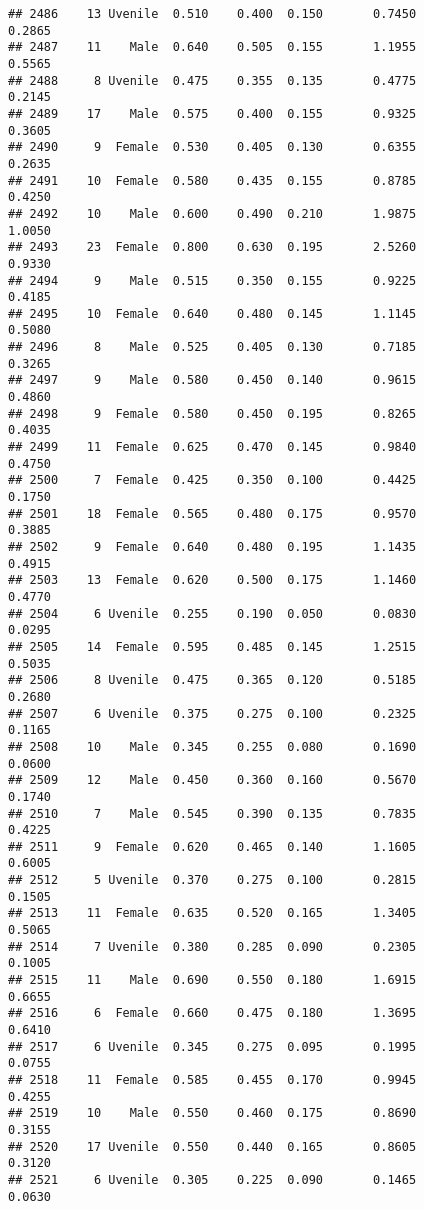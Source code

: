 \documentclass[
]{article}
\begin{document}
\begin{verbatim}
## 2486    13 Uvenile  0.510    0.400  0.150       0.7450         0.2865
## 2487    11    Male  0.640    0.505  0.155       1.1955         0.5565
## 2488     8 Uvenile  0.475    0.355  0.135       0.4775         0.2145
## 2489    17    Male  0.575    0.400  0.155       0.9325         0.3605
## 2490     9  Female  0.530    0.405  0.130       0.6355         0.2635
## 2491    10  Female  0.580    0.435  0.155       0.8785         0.4250
## 2492    10    Male  0.600    0.490  0.210       1.9875         1.0050
## 2493    23  Female  0.800    0.630  0.195       2.5260         0.9330
## 2494     9    Male  0.515    0.350  0.155       0.9225         0.4185
## 2495    10  Female  0.640    0.480  0.145       1.1145         0.5080
## 2496     8    Male  0.525    0.405  0.130       0.7185         0.3265
## 2497     9    Male  0.580    0.450  0.140       0.9615         0.4860
## 2498     9  Female  0.580    0.450  0.195       0.8265         0.4035
## 2499    11  Female  0.625    0.470  0.145       0.9840         0.4750
## 2500     7  Female  0.425    0.350  0.100       0.4425         0.1750
## 2501    18  Female  0.565    0.480  0.175       0.9570         0.3885
## 2502     9  Female  0.640    0.480  0.195       1.1435         0.4915
## 2503    13  Female  0.620    0.500  0.175       1.1460         0.4770
## 2504     6 Uvenile  0.255    0.190  0.050       0.0830         0.0295
## 2505    14  Female  0.595    0.485  0.145       1.2515         0.5035
## 2506     8 Uvenile  0.475    0.365  0.120       0.5185         0.2680
## 2507     6 Uvenile  0.375    0.275  0.100       0.2325         0.1165
## 2508    10    Male  0.345    0.255  0.080       0.1690         0.0600
## 2509    12    Male  0.450    0.360  0.160       0.5670         0.1740
## 2510     7    Male  0.545    0.390  0.135       0.7835         0.4225
## 2511     9  Female  0.620    0.465  0.140       1.1605         0.6005
## 2512     5 Uvenile  0.370    0.275  0.100       0.2815         0.1505
## 2513    11  Female  0.635    0.520  0.165       1.3405         0.5065
## 2514     7 Uvenile  0.380    0.285  0.090       0.2305         0.1005
## 2515    11    Male  0.690    0.550  0.180       1.6915         0.6655
## 2516     6  Female  0.660    0.475  0.180       1.3695         0.6410
## 2517     6 Uvenile  0.345    0.275  0.095       0.1995         0.0755
## 2518    11  Female  0.585    0.455  0.170       0.9945         0.4255
## 2519    10    Male  0.550    0.460  0.175       0.8690         0.3155
## 2520    17 Uvenile  0.550    0.440  0.165       0.8605         0.3120
## 2521     6 Uvenile  0.305    0.225  0.090       0.1465         0.0630

\end{verbatim}
\end{document}
